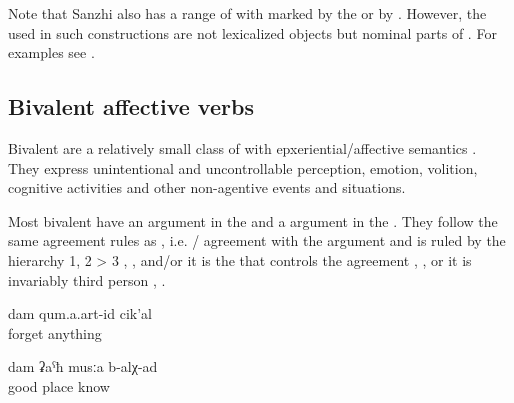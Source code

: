 Note that Sanzhi also has a range of  with  marked by the  or by . However, the  used in such constructions are not lexicalized objects but nominal parts of . For examples see .


\subsection{Bivalent affective verbs}
\label{sec:Bivalent affective verbs}
Bivalent  are a relatively small class of  with epxeriential\slash affective semantics . They express unintentional and uncontrollable perception, emotion, volition, cognitive activities and other non-agentive events and situations. 

%
\begin{exe}
	\ex	\label{ex:bivalent affective verbs}
	\begin{xlist}
		\ex	{} 
		\ex	{} 
		\ex	{} 
		\ex	{} 
		\ex	{} 
		\ex	{} 
		\ex	{} 
		\ex	{} 
		\ex	{} 
		\ex	{} 
		\ex	{} 
	\end{xlist}
\end{exe}

Most bivalent  have an  argument in the  and a  argument in the . They follow the same agreement rules as , i.e. / agreement with the  argument and  is ruled by the hierarchy 1, 2 > 3 , , and/or it is the  that controls the agreement , , or it is invariably third person , . 


\begin{exe}
	\ex	\label{ex:I did not forget anythingA}
	\gll	dam	qum.a.art-id	cik'al\\
			forget	anything\\
	\glt	{}

	\ex	\label{ex:I know a good place}
	\gll	dam	ʡaˁħ	musːa	b-alχ-ad\\
			good	place	know\\
	\glt	{}
	
\end{exe}


